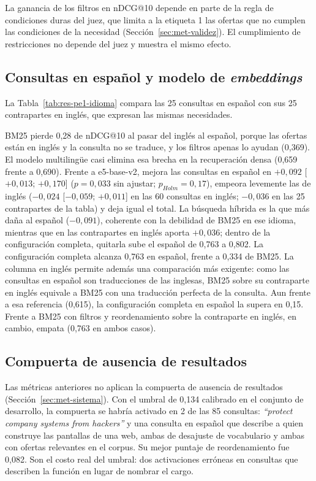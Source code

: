 La ganancia de los filtros en nDCG@10 depende en parte de la regla de condiciones duras del juez, que limita a la etiqueta 1 las ofertas que no cumplen las condiciones de la necesidad (Sección~\ref{sec:met-validez}). El cumplimiento de restricciones no depende del juez y muestra el mismo efecto.

\subsection{Consultas en español y modelo de \textit{embeddings}}

La Tabla~\ref{tab:res-pe1-idioma} compara las 25 consultas en español con sus 25 contrapartes en inglés, que expresan las mismas necesidades.



BM25 pierde 0,28 de nDCG@10 al pasar del inglés al español, porque las ofertas están en inglés y la consulta no se traduce, y los filtros apenas lo ayudan (0,369). El modelo multilingüe casi elimina esa brecha en la recuperación densa (0,659 frente a 0,690). Frente a e5-base-v2, mejora las consultas en español en $+0{,}092$ [$+0{,}013$; $+0{,}170$] ($p = 0{,}033$ sin ajustar; $p_{Holm} = 0{,}17$), empeora levemente las de inglés ($-0{,}024$ [$-0{,}059$; $+0{,}011$] en las 60 consultas en inglés; $-0{,}036$ en las 25 contrapartes de la tabla) y deja igual el total. La búsqueda híbrida es la que más daña al español ($-0{,}091$), coherente con la debilidad de BM25 en ese idioma, mientras que en las contrapartes en inglés aporta $+0{,}036$; dentro de la configuración completa, quitarla sube el español de 0,763 a 0,802. La configuración completa alcanza 0,763 en español, frente a 0,334 de BM25. La columna en inglés permite además una comparación más exigente: como las consultas en español son traducciones de las inglesas, BM25 sobre su contraparte en inglés equivale a BM25 con una traducción perfecta de la consulta. Aun frente a esa referencia (0,615), la configuración completa en español la supera en 0,15. Frente a BM25 con filtros y reordenamiento sobre la contraparte en inglés, en cambio, empata (0,763 en ambos casos).

\subsection{Compuerta de ausencia de resultados}

Las métricas anteriores no aplican la compuerta de ausencia de resultados (Sección~\ref{sec:met-sistema}). Con el umbral de 0,134 calibrado en el conjunto de desarrollo, la compuerta se habría activado en 2 de las 85 consultas: \textit{\enquote{protect company systems from hackers}} y una consulta en español que describe a quien construye las pantallas de una web, ambas de desajuste de vocabulario y ambas con ofertas relevantes en el corpus. Su mejor puntaje de reordenamiento fue 0,082. Son el costo real del umbral: dos activaciones erróneas en consultas que describen la función en lugar de nombrar el cargo.

